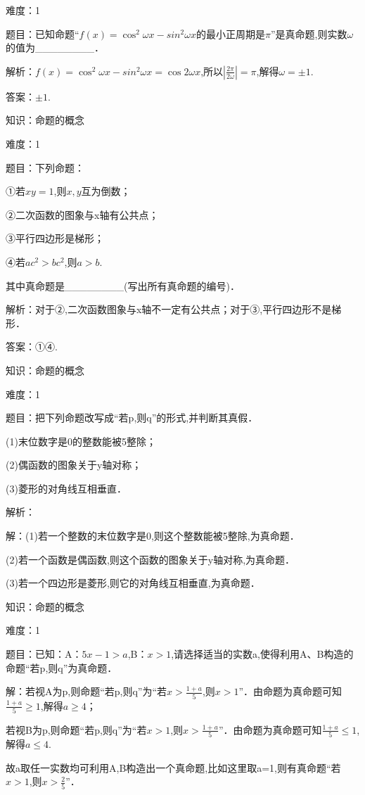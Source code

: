 \documentclass{article} %
\begin{document}
难度：1

题目：已知命题``$f(x)=\cos^{2}\omega x-sin^{2}\omega x$的最小正周期是$\pi$''是真命题,则实数$\omega$的值为\_\_\_\_\_\_\_\_．

解析：$f(x)=\cos^{2}\omega x-sin^{2}\omega x=\cos 2\omega x$,所以$|\frac{2\pi}{2\omega}|=\pi$,解得$\omega =\pm 1$.

答案：$\pm 1$.



知识：命题的概念

难度：1

题目：下列命题：

①若$xy=1$,则$x,y$互为倒数；

②二次函数的图象与x轴有公共点；

③平行四边形是梯形；

④若$ac^2>bc^2$,则$a>b$.

其中真命题是\_\_\_\_\_\_\_\_(写出所有真命题的编号)．

解析：对于②,二次函数图象与x轴不一定有公共点；对于③,平行四边形不是梯形．

答案：①④.



知识：命题的概念

难度：1

题目：把下列命题改写成``若p,则q''的形式,并判断其真假．

(1)末位数字是0的整数能被5整除；

(2)偶函数的图象关于y轴对称；

(3)菱形的对角线互相垂直．

解析：

解：(1)若一个整数的末位数字是0,则这个整数能被5整除,为真命题．

(2)若一个函数是偶函数,则这个函数的图象关于y轴对称,为真命题．

(3)若一个四边形是菱形,则它的对角线互相垂直,为真命题．



知识：命题的概念

难度：1

题目：已知：A：$5x-1>a$,B：$x>1$,请选择适当的实数a,使得利用A、B构造的命题``若p,则q''为真命题．

解：若视A为p,则命题``若p,则q''为``若$x>\frac{1+a}{5}$,则$x>1$''．由命题为真命题可知$\frac{1+a}{5}\ge 1$,解得$a\ge 4$；

若视B为p,则命题``若p,则q''为``若$x>1$,则$x>\frac{1+a}{5}$''．由命题为真命题可知$\frac{1+a}{5}\le 1$,解得$a\le 4$.

故a取任一实数均可利用A,B构造出一个真命题,比如这里取a=1,则有真命题``若$x>1$,则$x>\frac{2}{5}$''．
\end{document}

